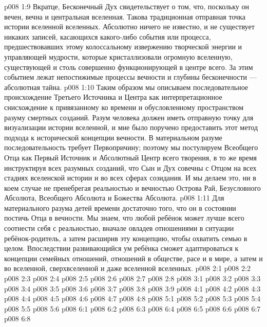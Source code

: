 \vs p008 1:9 Вкратце, Бесконечный Дух свидетельствует о том, что, поскольку он вечен, вечна и центральная вселенная. Такова традиционная отправная точка истории вселенной вселенных. Абсолютно ничего не известно, и не существует никаких записей, касающихся какого\hyp{}либо события или процесса, предшествовавших этому колоссальному извержению творческой энергии и управляющей мудрости, которые кристаллизовали огромную вселенную, существующей и столь совершенно функционирующей в центре всего. За этим событием лежат непостижимые процессы вечности и глубины бесконечности --- абсолютная тайна.
\vs p008 1:10 \pc Таким образом мы описываем последовательное происхождение Третьего Источника и Центра как интерпретационное снисхождение к привязанному ко времени и обусловленному пространством разуму смертных созданий. Разум человека должен иметь отправную точку для визуализации истории вселенной, и мне было поручено предоставить этот метод подхода к исторической концепции вечности. В материальном разуме последовательность требует Первопричину; поэтому мы постулируем Всеобщего Отца как Первый Источник и Абсолютный Центр всего творения, в то же время инструктируя всех разумных созданий, что Сын и Дух совечны с Отцом на всех стадиях вселенской истории и во всех сферах созидания. И мы делаем это, ни в коем случае не пренебрегая реальностью и вечностью Острова Рай, Безусловного Абсолюта, Всеобщего Абсолюта и Божества Абсолюта.
\vs p008 1:11 Для материального разума детей времени достаточно того, что он в состоянии постичь Отца в вечности. Мы знаем, что любой ребёнок может лучше всего соотнести себя с реальностью, вначале овладев отношениями в ситуации ребёнок\hyp{}родитель, а затем расширив эту концепцию, чтобы охватить семью в целом. Впоследствии развивающийся ум ребёнка сможет адаптироваться к концепции семейных отношений, отношений в обществе, расе и в мире, а затем и во вселенной, сверхвселенной и даже вселенной вселенных.
\vs p008 2:1 
\vs p008 2:2 \pc 
\vs p008 2:3 
\vs p008 2:4 \pc 
\vs p008 2:5 \pc 
\vs p008 2:6 
\vs p008 2:7 
\vs p008 2:8 
\vs p008 3:1 
\vs p008 3:2 
\vs p008 3:3 
\vs p008 3:4 
\vs p008 3:5 \pc 
\vs p008 3:6 
\vs p008 3:7 
\vs p008 3:8 
\vs p008 3:9 
\vs p008 4:1 
\vs p008 4:2 
\vs p008 4:3 
\vs p008 4:4 \pc 
\vs p008 4:5 
\vs p008 4:6 
\vs p008 4:7 \pc 
\vs p008 4:8 
\vs p008 5:1 
\vs p008 5:2 
\vs p008 5:3 \pc 
\vs p008 5:4 \pc 
\vs p008 5:5 
\vs p008 5:6 
\vs p008 6:1 
\vs p008 6:2 
\vs p008 6:3 
\vs p008 6:4 
\vs p008 6:5 
\vs p008 6:6 \pc 
\vs p008 6:7 
\vsetoff
\vs p008 6:8 
\quizlink
